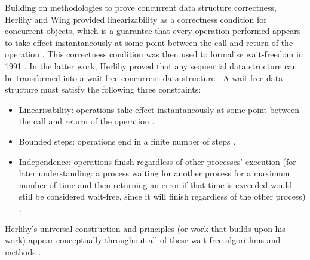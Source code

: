 Building on methodologies to prove concurrent data structure correctness, Herlihy and Wing provided linearizability as a correctness condition for concurrent objects, which is a guarantee that every operation performed appears to take effect instantaneously at some point between the call and return of the operation \cite{HerlihyLinearizability}. This correctness condition was then used to formalise wait-freedom in 1991 \cite{herlihy1991wait}. In the latter work, Herlihy proved that any sequential data structure can be transformed into a wait-free concurrent data structure \cite{herlihy1991wait}. A wait-free data structure must satisfy the following three constraints: 
\begin{itemize}
   \item Linearisability: operations take effect instantaneously at some point between the call and return of the operation \cite{herlihy1991wait}.
   \item Bounded steps: operations end in a finite number of steps \cite{herlihy1991wait}.
   \item Independence: operations finish regardless of other processes' execution (for later understanding: a process waiting for another process for a maximum number of time and then returning an error if that time is exceeded would still be considered wait-free, since it will finish regardless of the other process) \cite{herlihy1991wait}.
\end{itemize}

Herlihy's universal construction and principles (or work that builds upon his work) appear conceptually throughout all of these wait-free algorithms and methods \cite{Kogan2011WaitFreeQueues,kogan2012methodology,FeldmanDechevV2,RamalheteQueue,wCQWaitFreeQueue,Verma2013Scalable,FastFetchAndAddWaitFreeQueue,WangCacheCoherent,jiffy,JayantiLog,Drescher2015GuardedSections,Mateíspmc,torquati2010singleproducersingleconsumerqueuessharedcache,Wang2013BQueue,MaffioneCacheAware,ffq}. \cite{herlihy1991wait}

